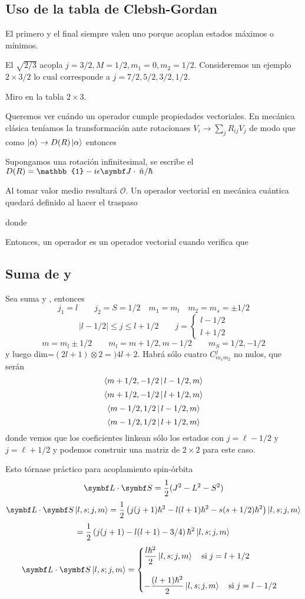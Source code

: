\documentclass[10pt,oneside]{CBFT_book}
\begin{document}
\subsection{Uso de la tabla de Clebsh-Gordan}

El primero y el final siempre valen uno porque acoplan estados máximos o mínimos.


El $\sqrt{2/3}$ acopla $j=3/2, M=1/2, m_1=0, m_2 =1/2$. Consideremos un ejemplo $2 \times 3/2$ lo cual 
corresponde a $j=7/2, 5/2, 3/2, 1/2$.


Miro en la tabla $2\times 3$.

Queremos ver cuándo un operador cumple propiedades vectoriales. En mecánica clásica teníamos la transformación
ante rotacionaes $V_i \to \sum_j R_{ij} V_j$ de modo que como $\Ket{\alpha} \to D(R)\Ket{\alpha}$ entonces


Supongamos una rotación infinitesimal, se escribe el $D(R) = \mathbb{1} - i \epsilon \vb J \cdot \nver / \hbar$



Al tomar valor medio resultará $\mathcal{O}$. Un operador vectorial en mecánica cuántica quedará definido
al hacer el traspaso


donde


Entonces, un operador es un operador vectorial cuando verifica que

\subsection{Suma de  y }

Sea suma  y , entonces 
\[
	j_1 = l \qquad j_2 = S= 1/2 \quad m_1=m_l \quad m_2=m_s = \pm 1/2
\]
\[
	|l - 1/2| \leq j \leq l + 1/2  \qquad j=\begin{cases} l-1/2 \\ l+1/2\end{cases}
\]
\[
	m = m_l \pm 1/2 \qquad m_l = m + 1/2 , m- 1/2 \qquad m_S = 1/2, -1/2
\]
y luego dim=$(2l+1)\otimes 2 =) 4l+2$.
Habrá sólo cuatro $C_{m_1 m_2}^j$ no nulos, que serán 
\[
	\Braket{ m + 1/2, -1/2 | l - 1/2, m }
\]
\[
	\Braket{ m + 1/2, -1/2 | l + 1/2, m }
\]
\[
	\Braket{ m - 1/2, 1/2 | l - 1/2, m }
\]
\[
	\Braket{ m - 1/2, 1/2 | l + 1/2, m }
\]
donde vemos que los coeficientes linkean sólo los estados con $j=\ell-1/2$ y $j=\ell+1/2$ y podemos construir 
una matriz de $2\times 2$ para este caso.

Esto tórnase práctico para acoplamiento spin-órbita 
\[
	\vb{L}\cdot\vb{S} = \frac{1}{2}(J^2 - L^2 - S^2)
\]
\[
	\vb{L}\cdot\vb{S} \Ket{l,s;j,m} =  \frac{1}{2}\left( j(j+1)\hbar^2 - 
		l(l+1)\hbar^2 - s(s+1/2)\hbar^2 \right) \Ket{l,s;j,m}
\]
\[
	= \frac{1}{2}\left( j(j+1) - l(l+1) - 3/4 \right) \hbar^2 \Ket{l,s;j,m}
\]
\[
	\vb{L}\cdot\vb{S} \Ket{l,s;j,m} = \begin{cases} 
		\displaystyle \frac{l\hbar^2}{2} \Ket{l,s;j,m} \quad \text{si} \; j=l+1/2\\ 
		\\
		\displaystyle -\frac{(l+1)\hbar^2}{2}\Ket{l,s;j,m} \quad \text{si} \; j=l-1/2
	\end{cases}
\]
\end{document}
